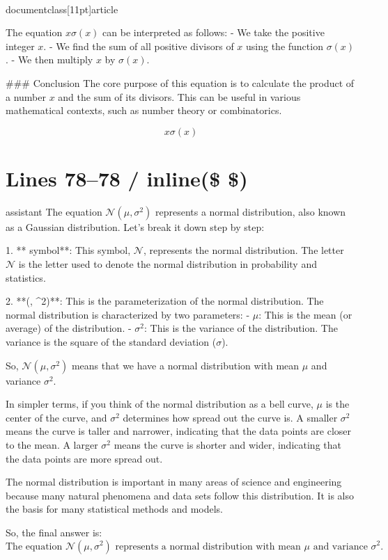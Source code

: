 \\documentclass[11pt]{article}
\begin{document}
The equation \( x\sigma(x) \) can be interpreted as follows:
- We take the positive integer \( x \).
- We find the sum of all positive divisors of \( x \) using the function \( \sigma(x) \).
- We then multiply \( x \) by \( \sigma(x) \).

### Conclusion
The core purpose of this equation is to calculate the product of a number \( x \) and the sum of its divisors. This can be useful in various mathematical contexts, such as number theory or combinatorics.

\[
\boxed{x\sigma(x)}
\]


\section*{Lines 78–78 / inline(\$ \$) }
assistant
The equation \(\mathcal{N}(\mu, \sigma^2)\) represents a normal distribution, also known as a Gaussian distribution. Let's break it down step by step:

1. ** symbol**: This symbol, \(\mathcal{N}\), represents the normal distribution. The letter \(\mathcal{N}\) is the letter used to denote the normal distribution in probability and statistics.

2. **(\mu, \sigma^2)**: This is the parameterization of the normal distribution. The normal distribution is characterized by two parameters:
   - \(\mu\): This is the mean (or average) of the distribution.
   - \(\sigma^2\): This is the variance of the distribution. The variance is the square of the standard deviation (\(\sigma\)).

So, \(\mathcal{N}(\mu, \sigma^2)\) means that we have a normal distribution with mean \(\mu\) and variance \(\sigma^2\).

In simpler terms, if you think of the normal distribution as a bell curve, \(\mu\) is the center of the curve, and \(\sigma^2\) determines how spread out the curve is. A smaller \(\sigma^2\) means the curve is taller and narrower, indicating that the data points are closer to the mean. A larger \(\sigma^2\) means the curve is shorter and wider, indicating that the data points are more spread out.

The normal distribution is important in many areas of science and engineering because many natural phenomena and data sets follow this distribution. It is also the basis for many statistical methods and models.

So, the final answer is:
\[
\boxed{\text{The equation } \mathcal{N}(\mu, \sigma^2) \text{ represents a normal distribution with mean } \mu \text{ and variance } \sigma^2.}
\]
\end{document}
